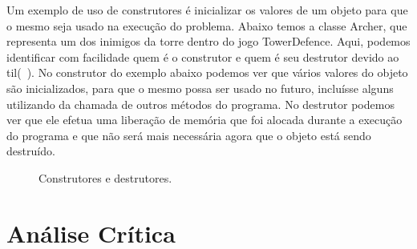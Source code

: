 \documentclass[rel_mlp]{iiufrgs}
\newcommand{\fonte}[1]{\\Fonte: {#1}}
\begin{document}
   	Um exemplo de uso de construtores é inicializar os valores de um objeto para que o mesmo seja usado na execução do problema. Abaixo temos a classe Archer, que representa um dos inimigos da torre dentro do jogo TowerDefence. Aqui, podemos identificar com facilidade quem é o construtor e quem é seu destrutor devido ao til(~). No construtor do exemplo abaixo podemos ver que vários valores do objeto são inicializados, para que o mesmo possa ser usado no futuro, incluísse alguns utilizando da chamada de outros métodos do programa.
   	No destrutor podemos ver que ele efetua uma liberação de memória que foi alocada durante a execução do programa e que não será mais necessária agora que o objeto está sendo destruído.


   \begin{figure}[htb]
       \centering
       \label{fig:figura8}
       \caption{Construtores e destrutores.}
   \end{figure}		 

 \section{Análise Crítica}
\end{document}
